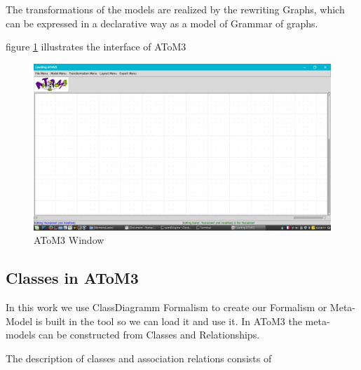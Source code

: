  The transformations of the models are realized by the rewriting
Graphs, which can be expressed in a declarative way as a model of
Grammar of graphs\cite{ch3-meta2}.

 figure \ref{fig:AToM3 Window} illustrates the interface of AToM3 

\begin{figure}[th]
	\centering
		\includegraphics[scale=0.33]{ch3/img/atom3}
	\caption{\label{fig:AToM3 Window}AToM3 Window}
\end{figure} 
\vspace{1cm}
\subsection{Classes in AToM3}
In this work we use ClassDiagramm Formalism to create our Formalism 
or Meta-Model is built in the tool so we can load it and use it\cite{ch3-meta2}.
In AToM3 the meta-models can be constructed from Classes and
Relationships.

The description of classes and association relations consists of

